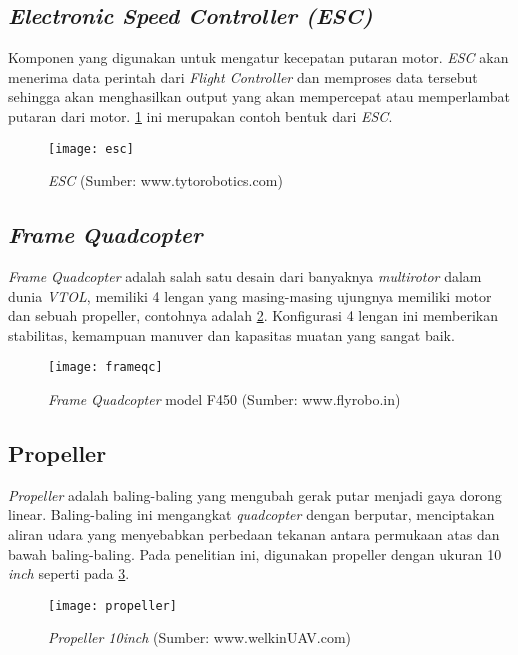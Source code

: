 \subsection{\textit{Electronic Speed Controller (ESC)} }
Komponen yang digunakan untuk mengatur kecepatan putaran motor. \textit{ESC} akan menerima data perintah dari \textit{Flight Controller} dan memproses data tersebut sehingga akan menghasilkan output yang akan mempercepat atau memperlambat putaran dari motor. \cref{fig:esc} ini merupakan contoh bentuk dari \textit{ESC}.

\begin{figure}[H]
	\centering
	\texttt{[image: esc]}
	\caption{\textit{ESC} (Sumber: www.tytorobotics.com)}
	\label{fig:esc}
\end{figure}

\subsection{\textit{Frame} \textit{Quadcopter}}
\textit{Frame} \textit{Quadcopter} adalah salah satu desain dari banyaknya \textit{multirotor} dalam dunia \textit{VTOL}, memiliki 4 lengan yang masing-masing ujungnya memiliki motor dan sebuah propeller, contohnya adalah \cref{fig:frame}. Konfigurasi 4 lengan ini memberikan stabilitas, kemampuan manuver dan kapasitas muatan yang sangat baik. 

\begin{figure}[H]
	\centering
	\texttt{[image: frameqc]}
	\caption{\textit{Frame} \textit{Quadcopter} model F450 (Sumber: www.flyrobo.in)}
	\label{fig:frame}
\end{figure}

\subsection{Propeller}
\textit{Propeller} adalah baling-baling yang mengubah gerak putar menjadi gaya dorong linear. Baling-baling ini mengangkat \textit{quadcopter} dengan berputar, menciptakan aliran udara yang menyebabkan perbedaan tekanan antara permukaan atas dan bawah baling-baling. Pada penelitian ini, digunakan propeller dengan ukuran 10 \textit{inch} seperti pada \cref{fig:propeller}.

\begin{figure}[H]
	\centering
	\texttt{[image: propeller]}
	\caption{\textit{Propeller 10inch} (Sumber: www.welkinUAV.com)}
	\label{fig:propeller}
\end{figure}

